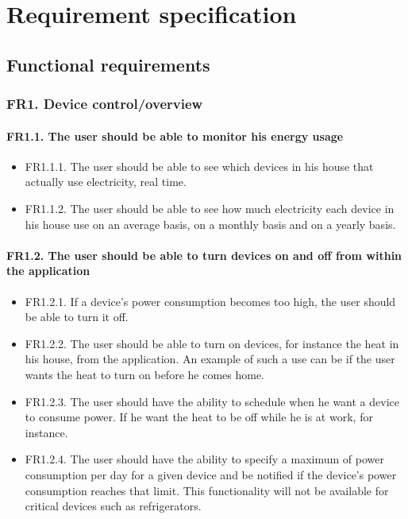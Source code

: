 \chapter{Requirement specification}
\section{Functional requirements}


\subsection{FR1. Device control/overview}
\subsubsection{FR1.1. The user should be able to monitor his energy usage}

\begin{itemize}
\item FR1.1.1. The user should be able to see which devices in his house that actually use electricity, real time.
\item FR1.1.2. The user should be able to see how much electricity each device in his house use on an average basis, on a monthly basis and on a yearly basis.
\end{itemize}

\subsubsection{FR1.2. The user should be able to turn devices on and off from within the application}
\begin{itemize}
\item FR1.2.1. If a device's power consumption becomes too high, the user should be able to turn it off.
\item FR1.2.2. The user should be able to turn on devices, for instance the heat in his house, from the application. An example of such a use can be if the user wants the heat to turn on before he comes home.
\item FR1.2.3. The user should have the ability to schedule when he want a device to consume power. If he want the heat to be off while he is at work, for instance. 
\item FR1.2.4. The user should have the ability to specify a maximum of power 
consumption per day for a given device and be notified if the device's power
consumption reaches that limit. This functionality will not be available
for critical devices such as refrigerators. 
\end{itemize}

